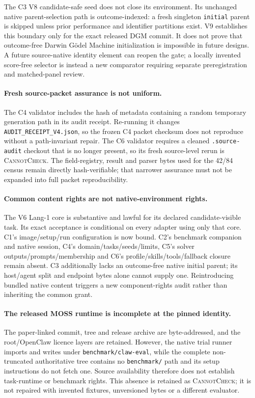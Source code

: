 The C3 V8 candidate-safe seed does not close its environment. Its unchanged
native parent-selection path is outcome-indexed: a fresh singleton
\texttt{initial} parent is skipped unless prior performance and identifier
partitions exist. V9 establishes this boundary only for the exact released DGM
commit. It does not prove that outcome-free Darwin G\"odel Machine
initialization is impossible in future designs. A future source-native identity
element can reopen the gate; a locally invented score-free selector is instead
a new comparator requiring separate preregistration and matched-panel review.

\paragraph{Fresh source-packet assurance is not uniform.}
The C4 validator includes the hash of metadata containing a random temporary
generation path in its audit receipt. Re-running it changes
\texttt{AUDIT\_RECEIPT\_V4.json}, so the frozen C4 packet checksum does not
reproduce without a path-invariant repair. The C6 validator requires a cleaned
\texttt{.source-audit} checkout that is no longer present, so its fresh
source-level rerun is \textsc{CannotCheck}. The field-registry, result and
parser bytes used for the 42/84 census remain directly hash-verifiable; that
narrower assurance must not be expanded into full packet reproducibility.

\paragraph{Common content rights are not native-environment rights.}
The V6 Lang-1 core is substantive and lawful for its declared candidate-visible
task. Its exact acceptance is conditional on every adapter using only that
core. C1's image/setup/run configuration is now bound. C2's benchmark companion
and native session, C4's domain/tasks/seeds/limits, C5's solver
outputs/prompts/membership and C6's profile/skills/tools/fallback closure remain
absent. C3 additionally lacks an outcome-free native initial parent; its
host/agent split and endpoint bytes alone cannot supply one. Reintroducing
bundled native content triggers a new
component-rights audit rather than inheriting the common grant.

\paragraph{The released MOSS runtime is incomplete at the pinned identity.}
The paper-linked commit, tree and release archive are byte-addressed, and the
root/OpenClaw licence layers are retained. However, the native trial runner
imports and writes under \texttt{benchmark/claw-eval}, while the complete
non-truncated authoritative tree contains no \texttt{benchmark/} path and its
setup instructions do not fetch one. Source availability therefore does not
establish task-runtime or benchmark rights. This absence is retained as
\textsc{CannotCheck}; it is not repaired with invented fixtures, unversioned
bytes or a different evaluator.

